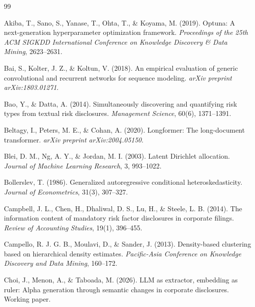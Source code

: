 \documentclass[11pt, a4paper]{article}
\begin{document}
\cleardoublepage
{}
\begin{thebibliography}{99}

     Akiba, T., Sano, S., Yanase, T., Ohta, T., \& Koyama, M. (2019). Optuna: A next-generation hyperparameter optimization framework. \textit{Proceedings of the 25th ACM SIGKDD International Conference on Knowledge Discovery \& Data Mining}, 2623--2631.

     Bai, S., Kolter, J. Z., \& Koltun, V. (2018). An empirical evaluation of generic convolutional and recurrent networks for sequence modeling. \textit{arXiv preprint arXiv:1803.01271}.

     Bao, Y., \& Datta, A. (2014). Simultaneously discovering and quantifying risk types from textual risk disclosures. \textit{Management Science}, 60(6), 1371--1391.

     Beltagy, I., Peters, M. E., \& Cohan, A. (2020). Longformer: The long-document transformer. \textit{arXiv preprint arXiv:2004.05150}.

     Blei, D. M., Ng, A. Y., \& Jordan, M. I. (2003). Latent Dirichlet allocation. \textit{Journal of Machine Learning Research}, 3, 993--1022.

     Bollerslev, T. (1986). Generalized autoregressive conditional heteroskedasticity. \textit{Journal of Econometrics}, 31(3), 307--327.

     Campbell, J. L., Chen, H., Dhaliwal, D. S., Lu, H., \& Steele, L. B. (2014). The information content of mandatory risk factor disclosures in corporate filings. \textit{Review of Accounting Studies}, 19(1), 396--455.

     Campello, R. J. G. B., Moulavi, D., \& Sander, J. (2013). Density-based clustering based on hierarchical density estimates. \textit{Pacific-Asia Conference on Knowledge Discovery and Data Mining}, 160--172.

     Choi, J., Menon, A., \& Taboada, M. (2026). LLM as extractor, embedding as ruler: Alpha generation through semantic changes in corporate disclosures. Working paper.


\end{thebibliography}
\end{document}
